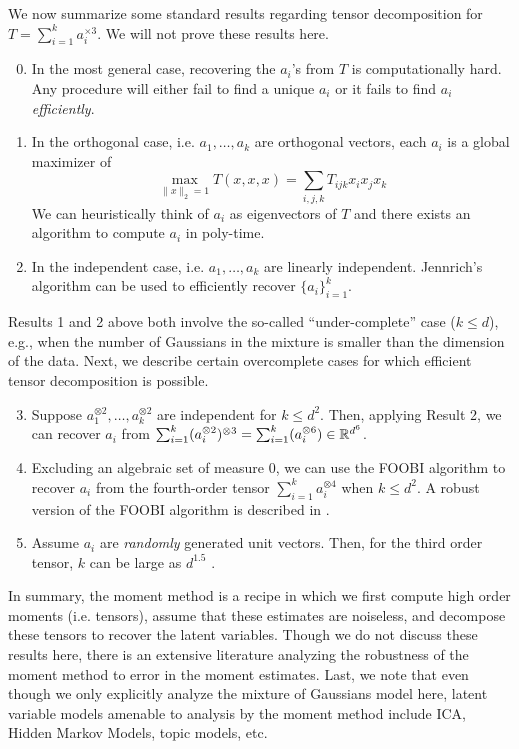 We now summarize some standard results regarding tensor decomposition for $T = \sum_{i = 1}^k a_i^{\times 3}$. We will not prove these results here.
\begin{enumerate}
\setcounter{enumi}{-1}
\item  In the most general case, recovering the $a_i$'s from $T$ is computationally hard. Any procedure will either fail to find a unique $a_i$ or it fails to find $a_i$ \emph{efficiently}. 
\item In the orthogonal case, i.e. $a_1,\dots,a_k$ are orthogonal vectors, each $a_i$ is a global maximizer of 
\begin{equation}
    \max_{\|x\|_2 = 1} T(x,x,x) = \sum_{i,j,k} T_{ijk} x_i x_j x_k
\end{equation}
We can heuristically think of $a_i$ as eigenvectors of $T$ and there exists an algorithm to compute $a_i$ in poly-time.
\item In the independent case, i.e. $a_1,\dots,a_k$ are linearly independent. Jennrich's algorithm can be used to efficiently recover $\{a_i\}_{i = 1}^k$.
\end{enumerate} 
Results 1 and 2 above both involve the so-called ``under-complete'' case ($k \leq d$), e.g., when the number of Gaussians in the mixture is smaller than the dimension of the data. Next, we describe certain overcomplete cases for which efficient tensor decomposition is possible.
\begin{enumerate}
\setcounter{enumi}{2}
\item Suppose $a_1^{\otimes2},\dots,a_k^{\otimes2}$ are independent for $k \leq d^2$. Then, applying Result 2, we can recover $a_i$ from $\sum_{i=1}^k (a_i^{\otimes2})^{\otimes3} = \sum_{i=1}^k (a_i^{\otimes6}) \in \mathbb R^{d^6}$.
\item Excluding an algebraic set of measure $0$, we can use the FOOBI algorithm to recover $a_i$ from the fourth-order tensor $\sum_{i = 1}^k a_i^{\otimes 4}$ when $k \leq d^2$. A robust version of the FOOBI algorithm is described in \citet{ma2016poly}.
\item Assume $a_i$ are \emph{randomly} generated unit vectors. Then, for the third order tensor, $k$ can be large as $d^{1.5}$ \cite{ma2016poly, schrammsteurer17}. 
\end{enumerate}

In summary, the moment method is a recipe in which we first compute high order moments (i.e. tensors), assume that these estimates are noiseless, and decompose these tensors to recover the latent variables. Though we do not discuss these results here, there is an extensive literature analyzing the robustness of the moment method to error in the moment estimates. Last, we note that even though we only explicitly analyze the mixture of Gaussians model here, latent variable models amenable to analysis by the moment method include ICA, Hidden Markov Models, topic models, etc.

